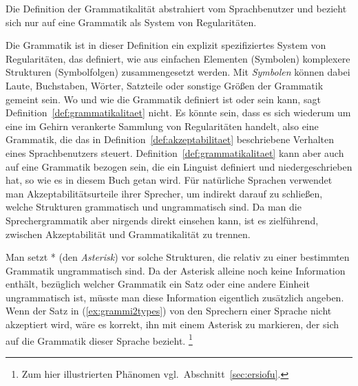 Die Definition der Grammatikalität abstrahiert vom Sprachbenutzer und bezieht sich nur auf eine Grammatik als System von Regularitäten.


Die Grammatik ist in dieser Definition ein explizit spezifiziertes System von Regularitäten, das definiert, wie aus einfachen Elementen (Symbolen) komplexere Strukturen (Symbolfolgen) zusammengesetzt werden.
Mit \textit{Symbolen} können dabei Laute, Buchstaben, Wörter, Satzteile oder sonstige Größen der Grammatik gemeint sein.
Wo und wie die Grammatik definiert ist oder sein kann, sagt Definition~\ref{def:grammatikalitaet} nicht.
Es könnte sein, dass es sich wiederum um eine im Gehirn verankerte Sammlung von Regularitäten handelt, also eine Grammatik, die das in Definition~\ref{def:akzeptabilitaet} beschriebene Verhalten eines Sprachbenutzers steuert.
Definition~\ref{def:grammatikalitaet} kann aber auch auf eine Grammatik bezogen sein, die ein Linguist definiert und niedergeschrieben hat, so wie es in diesem Buch getan wird.
Für natürliche Sprachen verwendet man Akzeptabilitätsurteile ihrer Sprecher, um indirekt darauf zu schließen, welche Strukturen grammatisch und ungrammatisch sind.
Da man die Sprechergrammatik aber nirgends direkt einsehen kann, ist es zielführend, zwischen Akzeptabilität und Grammatikalität zu trennen.

Man setzt * (den \textit{Asterisk}) vor solche Strukturen, die relativ zu einer bestimmten Grammatik ungrammatisch sind.
Da der Asterisk alleine noch keine Information enthält, bezüglich welcher Grammatik ein Satz oder eine andere Einheit ungrammatisch ist, müsste man diese Information eigentlich zusätzlich angeben.
Wenn der Satz in (\ref{ex:grammi2types}) von den Sprechern einer Sprache nicht akzeptiert wird, wäre es korrekt, ihn mit einem Asterisk zu markieren, der sich auf die Grammatik dieser Sprache bezieht.%
\footnote{Zum hier illustrierten Phänomen vgl.\ Abschnitt~\ref{sec:ersiofu}.}

\begin{exe}
  \ex\label{ex:grammi2types}
  \begin{xlist}
  \end{xlist}
\end{exe}

